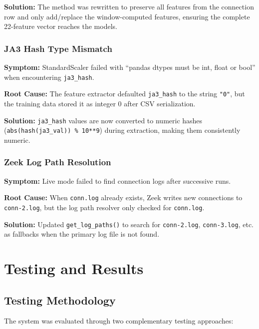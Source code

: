 \documentclass[12pt,a4paper,twoside]{report}
\begin{document}
\textbf{Solution:} The method was rewritten to preserve all features from the connection row and only add/replace the window-computed features, ensuring the complete 22-feature vector reaches the models.

\subsection{JA3 Hash Type Mismatch}

\textbf{Symptom:} StandardScaler failed with ``pandas dtypes must be int, float or bool'' when encountering \texttt{ja3\_hash}.

\textbf{Root Cause:} The feature extractor defaulted \texttt{ja3\_hash} to the string \texttt{"0"}, but the training data stored it as integer 0 after CSV serialization.

\textbf{Solution:} \texttt{ja3\_hash} values are now converted to numeric hashes (\texttt{abs(hash(ja3\_val)) \% 10**9}) during extraction, making them consistently numeric.

\subsection{Zeek Log Path Resolution}

\textbf{Symptom:} Live mode failed to find connection logs after successive runs.

\textbf{Root Cause:} When \texttt{conn.log} already exists, Zeek writes new connections to \texttt{conn-2.log}, but the log path resolver only checked for \texttt{conn.log}.

\textbf{Solution:} Updated \texttt{get\_log\_paths()} to search for \texttt{conn-2.log}, \texttt{conn-3.log}, etc. as fallbacks when the primary log file is not found.

\chapter{Testing and Results}

\section{Testing Methodology}

The system was evaluated through two complementary testing approaches:
\end{document}
